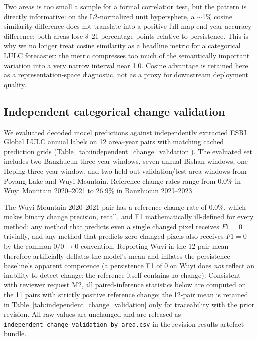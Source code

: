 \documentclass{article}
\begin{document}
Two areas is too small a sample for a formal correlation test, but the pattern is directly informative: on the L2-normalized unit hypersphere, a $\sim$1\% cosine similarity difference does not translate into a positive full-map end-year accuracy difference; both areas lose 8--21 percentage points relative to persistence. This is why we no longer treat cosine similarity as a headline metric for a categorical LULC forecaster: the metric compresses too much of the semantically important variation into a very narrow interval near 1.0. Cosine advantage is retained here as a representation-space diagnostic, not as a proxy for downstream deployment quality.

\subsection{Independent categorical change validation}
\label{sec:independent_change_validation}

We evaluated decoded model predictions against independently extracted ESRI Global LULC annual labels on 12 area--year pairs with matching cached prediction grids (Table~\ref{tab:independent_change_validation}). The evaluated set includes two Banzhucun three-year windows, seven annual Bishan windows, one Heping three-year window, and two held-out validation/test-area windows from Poyang Lake and Wuyi Mountain. Reference change rates range from 0.0\% in Wuyi Mountain 2020--2021 to 26.9\% in Banzhucun 2020--2023.

The Wuyi Mountain 2020--2021 pair has a reference change rate of 0.0\%, which makes binary change precision, recall, and F1 mathematically ill-defined for every method: any method that predicts even a single changed pixel receives $F1=0$ trivially, and any method that predicts zero changed pixels also receives $F1=0$ by the common $0/0 \to 0$ convention. Reporting Wuyi in the 12-pair mean therefore artificially deflates the model's mean and inflates the persistence baseline's apparent competence (a persistence F1 of $0$ on Wuyi does \emph{not} reflect an inability to detect change; the reference itself contains no change). Consistent with reviewer request M2, all paired-inference statistics below are computed on the 11 pairs with strictly positive reference change; the 12-pair mean is retained in Table~\ref{tab:independent_change_validation} only for traceability with the prior revision. All raw values are unchanged and are released as \texttt{independent\_change\_validation\_by\_area.csv} in the revision-results artefact bundle.
\end{document}

